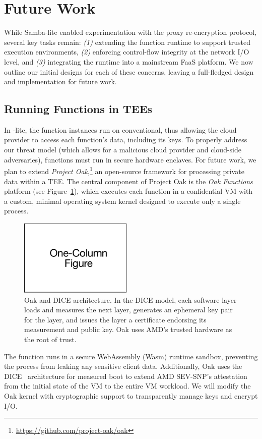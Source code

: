 \section{Future Work}
\label{sec:future}

While Samba-lite enabled experimentation with the proxy re-encryption protocol,
several key tasks remain: \emph{(1)} extending the function runtime to support
trusted execution environments, \emph{(2)} enforcing control-flow integrity at
the network I/O level, and \emph{(3)} integrating the runtime into a mainstream
FaaS platform.
%
We now outline our initial designs for each of these concerns, leaving a
full-fledged design and implementation for future work.


\subsection{Running Functions in TEEs}

In \SystemName-lite, the function instances run on conventional, thus allowing
the cloud provider to access each function's data, including its keys.
%
To properly address our threat model (which allows for a malicious cloud
provider and cloud-side adversaries), functions must run in secure hardware
enclaves.
%
For future work, we plan to extend \emph{Project Oak},\footnote{
\url{https://github.com/project-oak/oak}
}
an open-source framework for processing private data within a TEE\@.
%
The central component of Project Oak is the \emph{Oak Functions} platform (see
Figure~\ref{fig:oak}), which executes each function in a confidential VM with a
custom, minimal operating system kernel designed to execute only a single
process.
%
\begin{figure}
    \centering
    \includegraphics[page = 3, width=0.48\textwidth]{diagrams/slides.pdf}
    \caption{Oak and DICE architecture.
    In the DICE model, each software layer loads and measures the next layer,
    generates an ephemeral key pair for the layer, and issues the layer a
    certificate endorsing its measurement and public key.
    Oak uses AMD's trusted hardware as the root of trust.
    }
    \label{fig:oak}
\end{figure}
%
The function runs in a secure WebAssembly (Wasm) runtime sandbox, preventing
the process from leaking any sensitive client data.
%
Additionally, Oak uses the DICE~\cite{24-misc-dice} architecture for measured
boot to extend AMD SEV-SNP's attestation from the initial state of the VM
to the entire VM workload.
%
We will modify the Oak kernel with cryptographic support to transparently
manage keys and encrypt I/O\@.



